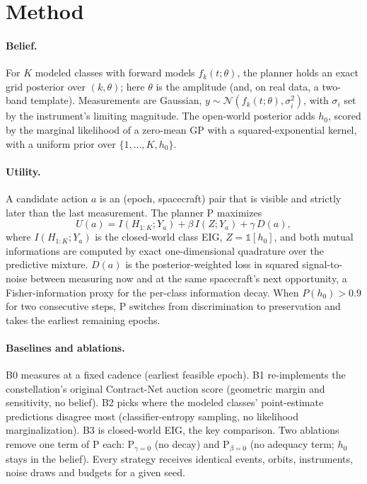 \documentclass[12pt]{article}
\begin{document}
\section{Method}\label{sec:method}
\paragraph{Belief.} For $K$ modeled classes with forward models $f_k(t;\theta)$, the planner holds an exact grid posterior over $(k,\theta)$; here $\theta$ is the amplitude (and, on real data, a two-band template). Measurements are Gaussian, $y\sim\mathcal N(f_k(t;\theta),\sigma_i^2)$, with $\sigma_i$ set by the instrument's limiting magnitude. The open-world posterior adds $h_0$, scored by the marginal likelihood of a zero-mean GP with a squared-exponential kernel, with a uniform prior over $\{1,\dots,K,h_0\}$.

\paragraph{Utility.} A candidate action $a$ is an (epoch, spacecraft) pair that is visible and strictly later than the last measurement. The planner P maximizes
\begin{equation}
U(a) = I(H_{1:K};Y_a) + \beta\, I(Z;Y_a) + \gamma\, D(a),
\end{equation}
where $I(H_{1:K};Y_a)$ is the closed-world class EIG, $Z=\mathbb 1[h_0]$, and both mutual informations are computed by exact one-dimensional quadrature over the predictive mixture. $D(a)$ is the posterior-weighted loss in squared signal-to-noise between measuring now and at the same spacecraft's next opportunity, a Fisher-information proxy for the per-class information decay. When $P(h_0)>0.9$ for two consecutive steps, P switches from discrimination to preservation and takes the earliest remaining epochs.

\paragraph{Baselines and ablations.} B0 measures at a fixed cadence (earliest feasible epoch). B1 re-implements the constellation's original Contract-Net auction score (geometric margin and sensitivity, no belief). B2 picks where the modeled classes' point-estimate predictions disagree most (classifier-entropy sampling, no likelihood marginalization). B3 is closed-world EIG, the key comparison. Two ablations remove one term of P each: P$_{\gamma=0}$ (no decay) and P$_{\beta=0}$ (no adequacy term; $h_0$ stays in the belief). Every strategy receives identical events, orbits, instruments, noise draws and budgets for a given seed.
\end{document}
